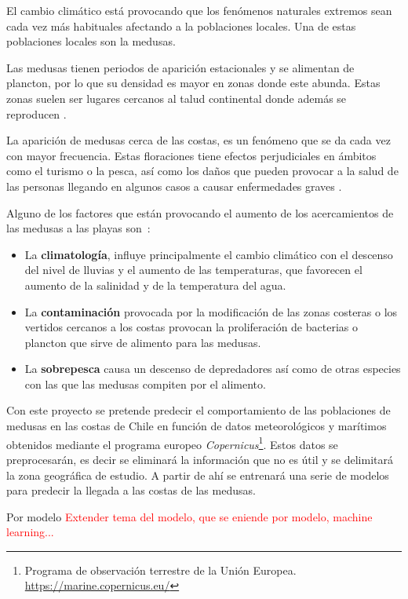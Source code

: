 
\begin{comment}
Descripción del contenido del trabajo y del estrucutra de la memoria y del resto de materiales entregados.
\end{comment}

El cambio climático está provocando que los fenómenos naturales extremos sean cada vez más habituales afectando a la poblaciones locales. Una de estas poblaciones locales son la medusas.

Las medusas tienen periodos de aparición estacionales y se alimentan de plancton, por lo que su densidad es mayor en zonas donde este abunda. Estas zonas suelen ser lugares cercanos al talud continental donde además se reproducen \cite{noauthor_proliferaciones_nodate}. %

La aparición de medusas cerca de las costas, es un fenómeno que se da cada vez con mayor frecuencia. Estas floraciones tiene efectos perjudiciales en ámbitos como el turismo o la pesca, así como los daños que pueden provocar a la salud de las personas llegando en algunos casos a causar enfermedades graves \cite{art:picaduras_1,art:picaduras_2}. 

Alguno de los factores que están provocando el aumento de los acercamientos de las medusas a las playas son~\cite{noauthor_proliferaciones_nodate,art:ArticuloCanepa_1}:
\begin{itemize}
	\item La \textbf{climatología}, influye principalmente el cambio climático con el descenso del nivel de lluvias y el aumento de las temperaturas, que favorecen el aumento de la salinidad y de la temperatura del agua. 
	\item La \textbf{contaminación} provocada por la modificación de las zonas costeras o los vertidos cercanos a los costas provocan la proliferación de bacterias o plancton que sirve de alimento para las medusas.
	\item La \textbf{sobrepesca} causa un descenso de depredadores así como de otras especies con las que las medusas compiten por el alimento.
\end{itemize}

Con este proyecto se pretende predecir el comportamiento de las poblaciones de medusas en las costas de Chile en función de datos meteorológicos y marítimos obtenidos mediante el programa europeo \emph{Copernicus}\footnote{Programa de observación terrestre de la Unión Europea. \url{https://marine.copernicus.eu/}}. Estos datos se preprocesarán, es decir se eliminará la información que no es útil y se delimitará la zona geográfica de estudio. A partir de ahí se entrenará una serie de modelos para predecir la llegada a las costas de las medusas.

Por modelo
\textcolor{red}{Extender tema del modelo, que se eniende por modelo, machine learning...}